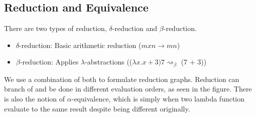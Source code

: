 \subsection{Reduction and Equivalence}
There are two types of reduction, $\delta$-reduction and $\beta$-reduction.
\begin{itemize}
	\item $\delta$-reduction: Basic arithmetic reduction ($m x n \rightarrow mn$)
	\item $\beta$-reduction: Applies $\lambda$-abstractions (($\lambda x.x + 3)7 \rightsquigarrow_{\beta}$ (7 + 3))
\end{itemize}
We use a combination of both to formulate reduction graphs. Reduction can branch of and be done in different evaluation orders, as seen in the figure. There is also the notion of $\alpha$-equivalence, which is simply when two lambda function evaluate to the same result despite being different originally.
